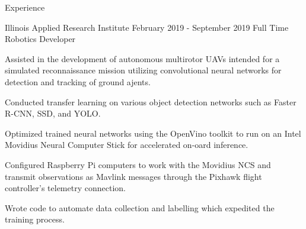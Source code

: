 \documentclass{resume} %
\begin{document}
    \begin{rSection}{Experience}

        \begin{rSubsection}{Illinois Applied Research Institute} {February 2019 - September 2019} {Full Time Robotics Developer}

            \item Assisted in the development of autonomous multirotor UAVs intended for a simulated reconnaissance mission utilizing convolutional neural networks for detection and tracking of ground ajents.
            \item Conducted transfer learning on various object detection networks such as Faster R-CNN, SSD, and YOLO.
            \item Optimized trained neural networks using the OpenVino toolkit to run on an Intel Movidius Neural Computer Stick for accelerated on-oard inference.
            \item Configured Raspberry Pi computers to work with the Movidius NCS and transmit observations as Mavlink messages through the Pixhawk flight controller's telemetry connection.
            \item Wrote code to automate data collection and labelling which expedited the training process.

        \end{rSubsection}

    \end{rSection}

\end{document}
